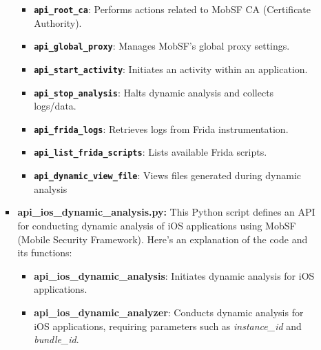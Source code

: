 \documentclass{report}
\begin{document}
\begin{itemize}
\begin{itemize}
\begin{itemize}
\begin{itemize}
            \item \textbf \texttt{api\_root\_ca}: Performs actions related to MobSF CA (Certificate Authority).
            
            \item \textbf \texttt{api\_global\_proxy}: Manages MobSF's global proxy settings.
            
            \item \textbf \texttt{api\_start\_activity}: Initiates an activity within an application.
            
            \item \textbf \texttt{api\_stop\_analysis}: Halts dynamic analysis and collects logs/data.
            
            \item \textbf \texttt{api\_frida\_logs}: Retrieves logs from Frida instrumentation.
            
            \item \textbf \texttt{api\_list\_frida\_scripts}: Lists available Frida scripts.
            
            \item \textbf \texttt{api\_dynamic\_view\_file}: Views files generated during dynamic analysis
           \end{itemize}

            \item \textbf{api\_ios\_dynamic\_analysis.py:}
                This Python script defines an API for conducting dynamic analysis of iOS applications using MobSF (Mobile Security Framework). Here's an explanation of the code and its functions:
                \begin{itemize}
                    \item \textbf{api\_ios\_dynamic\_analysis}: Initiates dynamic analysis for iOS applications.
                    
                    \item \textbf{api\_ios\_dynamic\_analyzer}: Conducts dynamic analysis for iOS applications, requiring parameters such as \textit{instance\_id} and \textit{bundle\_id}.
                    

\end{itemize}
\end{itemize}
\end{itemize}
\end{itemize}
\end{document}
